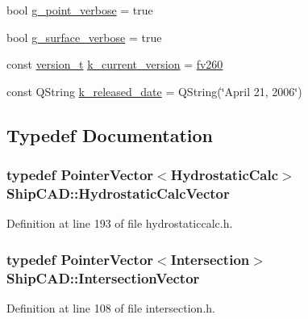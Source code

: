 \begin{DoxyCompactItemize}
\item 
bool \hyperlink{namespaceShipCAD_ae059a88fbc18c56ceee2fd1cd7f2aad0}{g\-\_\-point\-\_\-verbose} = true
\item 
bool \hyperlink{namespaceShipCAD_a45538d3cd2c9293bf0bd4b09a23670ac}{g\-\_\-surface\-\_\-verbose} = true
\item 
const \hyperlink{namespaceShipCAD_af3a6fa23a7318acbda7b0066b53d694f}{version\-\_\-t} \hyperlink{namespaceShipCAD_aa3415e1acf9bdb19e24f31f5138d6a60}{k\-\_\-current\-\_\-version} = \hyperlink{namespaceShipCAD_af3a6fa23a7318acbda7b0066b53d694fa3e815680f28b362a51b70712e376e7d7}{fv260}
\item 
const Q\-String \hyperlink{namespaceShipCAD_a833fc6d39d2f0fd7fa31d0a691b0b726}{k\-\_\-released\-\_\-date} = Q\-String(\char`\"{}April 21, 2006\char`\"{})
\end{DoxyCompactItemize}


\subsection{Typedef Documentation}
\hypertarget{namespaceShipCAD_a0c7b012d8868cbb43871cf0bf303ccc6}{
\subsubsection[{Hydrostatic\-Calc\-Vector}]{\setlength{\rightskip}{0pt plus 5cm}typedef {\bf Pointer\-Vector}$<${\bf Hydrostatic\-Calc}$>$ {\bf Ship\-C\-A\-D\-::\-Hydrostatic\-Calc\-Vector}}}\label{namespaceShipCAD_a0c7b012d8868cbb43871cf0bf303ccc6}


Definition at line 193 of file hydrostaticcalc.\-h.

\hypertarget{namespaceShipCAD_a9910f0963197f9df6125398efd4fa139}{
\subsubsection[{Intersection\-Vector}]{\setlength{\rightskip}{0pt plus 5cm}typedef {\bf Pointer\-Vector}$<${\bf Intersection}$>$ {\bf Ship\-C\-A\-D\-::\-Intersection\-Vector}}}\label{namespaceShipCAD_a9910f0963197f9df6125398efd4fa139}


Definition at line 108 of file intersection.\-h.

